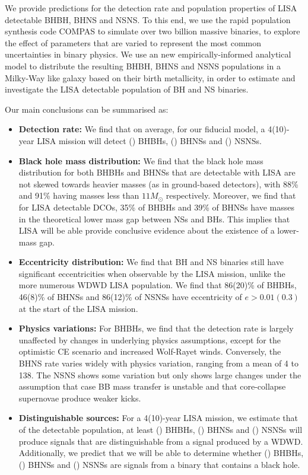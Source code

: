 We provide predictions for the detection rate and population properties of LISA detectable BHBH, BHNS and NSNS.
To this end, we use the rapid population synthesis code COMPAS to simulate over two billion massive binaries, to explore the effect of parameters that are varied to represent the most common uncertainties in binary physics. We use an new empirically-informed analytical model to distribute the resulting BHBH, BHNS and NSNS populations in a Milky-Way like galaxy based on their birth metallicity, in order to estimate and investigate the LISA detectable population of BH and NS binaries.

Our main conclusions can be summarised as:
\begin{itemize}
    \item \textbf{Detection rate:} We find that on average, for our fiducial model, a 4(10)-year LISA mission will detect \BHBHFourYear{}(\BHBHTenYear{}) BHBHs, \BHNSFourYear{}(\BHNSTenYear{}) BHNSs and \NSNSFourYear{}(\NSNSTenYear{}) NSNSs.
    \item \textbf{Black hole mass distribution:} We find that the black hole mass distribution for both BHBHs and BHNSs that are detectable with LISA are not skewed towards heavier masses (as in ground-based detectors), with 88\% and 91\% having masses less than $11 \unit{M_\odot}$ respectively. Moreover, we find that for LISA detectable DCOs, 35\% of BHBHs and 39\% of BHNSs have masses in the theoretical lower mass gap between NSs and BHs. This implies that LISA will be able provide conclusive evidence about the existence of a lower-mass gap. 
    \item \textbf{Eccentricity distribution:} We find that BH and NS binaries still have significant eccentricities when observable by the LISA mission, unlike the more numerous WDWD LISA population. We find that 86(20)\% of BHBHs, 46(8)\% of BHNSs and 86(12)\% of NSNSs have eccentricity of $e > 0.01(0.3)$ at the start of the LISA mission.
    \item \textbf{Physics variations:} For BHBHs, we find that the detection rate is largely unaffected by changes in underlying physics assumptions, except for the optimistic CE scenario and increased Wolf-Rayet winds. Conversely, the BHNS rate varies widely with physics variation, ranging from a mean of 4 to 138. The NSNS shows some variation but only shows large changes under the assumption that case BB mass transfer is unstable and that core-collapse supernovae produce weaker kicks.
    \item \textbf{Distinguishable sources:} For a 4(10)-year LISA mission, we estimate that of the detectable population, at least \BHBHNotWDWDFour{}(\BHBHNotWDWDTen{}) BHBHs, \BHNSNotWDWDFour{}(\BHNSNotWDWDTen{}) BHNSs and \NSNSNotWDWDFour{}(\NSNSNotWDWDTen{}) NSNSs will produce signals that are distinguishable from a signal produced by a WDWD. Additionally, we predict that we will be able to determine whether \BHBHDistinguishedFour{}(\BHBHDistinguishedTen{}) BHBHs, \BHNSDistinguishedFour{}(\BHNSDistinguishedTen{}) BHNSs and \NSNSDistinguishedFour{}(\NSNSDistinguishedTen{}) NSNSs are signals from a binary that contains a black hole.

\end{itemize}
